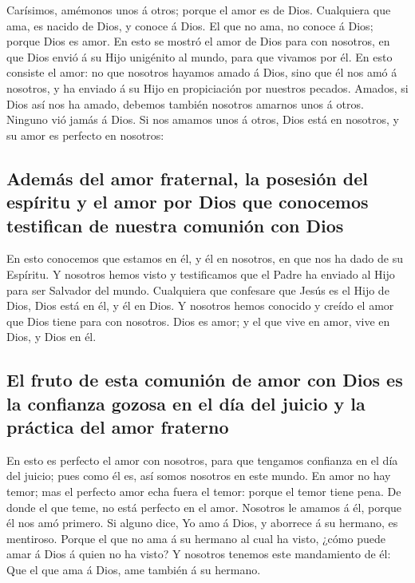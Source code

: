  Carísimos, amémonos unos á otros; porque el amor es de
Dios. Cualquiera que ama, es nacido de Dios, y conoce á Dios.
 El que no ama, no conoce á Dios; porque Dios es amor.
 En esto se mostró el amor de Dios para con nosotros, en que
Dios envió á su Hijo unigénito al mundo, para que vivamos por él.
 En esto consiste el amor: no que nosotros hayamos amado á
Dios, sino que él nos amó á nosotros, y ha enviado á su Hijo en
propiciación por nuestros pecados.  Amados, si Dios así nos
ha amado, debemos también nosotros amarnos unos á otros. 
Ninguno vió jamás á Dios. Si nos amamos unos á otros, Dios está en
nosotros, y su amor es perfecto en nosotros:

\hypertarget{ademuxe1s-del-amor-fraternal-la-posesiuxf3n-del-espuxedritu-y-el-amor-por-dios-que-conocemos-testifican-de-nuestra-comuniuxf3n-con-dios}{%
\subsection{Además del amor fraternal, la posesión del espíritu y el
amor por Dios que conocemos testifican de nuestra comunión con
Dios}\label{ademuxe1s-del-amor-fraternal-la-posesiuxf3n-del-espuxedritu-y-el-amor-por-dios-que-conocemos-testifican-de-nuestra-comuniuxf3n-con-dios}}

 En esto conocemos que estamos en él, y él en nosotros, en
que nos ha dado de su Espíritu.  Y nosotros hemos visto y
testificamos que el Padre ha enviado al Hijo para ser Salvador del
mundo.  Cualquiera que confesare que Jesús es el Hijo de
Dios, Dios está en él, y él en Dios.  Y nosotros hemos
conocido y creído el amor que Dios tiene para con nosotros. Dios es
amor; y el que vive en amor, vive en Dios, y Dios en él.

\hypertarget{el-fruto-de-esta-comuniuxf3n-de-amor-con-dios-es-la-confianza-gozosa-en-el-duxeda-del-juicio-y-la-pruxe1ctica-del-amor-fraterno}{%
\subsection{El fruto de esta comunión de amor con Dios es la confianza
gozosa en el día del juicio y la práctica del amor
fraterno}\label{el-fruto-de-esta-comuniuxf3n-de-amor-con-dios-es-la-confianza-gozosa-en-el-duxeda-del-juicio-y-la-pruxe1ctica-del-amor-fraterno}}

 En esto es perfecto el amor con nosotros, para que
tengamos confianza en el día del juicio; pues como él es, así somos
nosotros en este mundo.  En amor no hay temor; mas el
perfecto amor echa fuera el temor: porque el temor tiene pena. De donde
el que teme, no está perfecto en el amor.  Nosotros le
amamos á él, porque él nos amó primero.  Si alguno dice, Yo
amo á Dios, y aborrece á su hermano, es mentiroso. Porque el que no ama
á su hermano al cual ha visto, ¿cómo puede amar á Dios á quien no ha
visto?  Y nosotros tenemos este mandamiento de él: Que el
que ama á Dios, ame también á su hermano.

